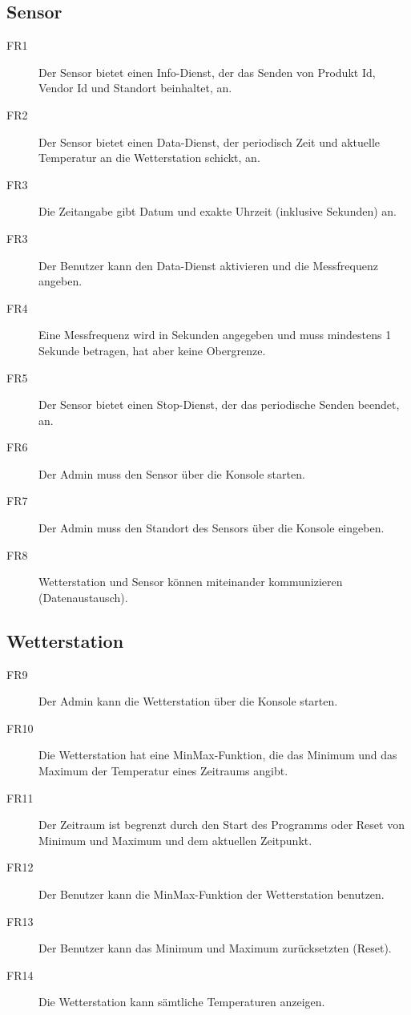 \documentclass[a4paper]{report}
\begin{document}
\subsection{Sensor}
\begin{description}
    \item[FR1] Der Sensor bietet einen Info-Dienst, der das Senden von Produkt Id, Vendor Id und Standort beinhaltet, an.
    \item[FR2] Der Sensor bietet einen Data-Dienst, der periodisch Zeit und aktuelle Temperatur an die Wetterstation schickt, an.
    \item[FR3] Die Zeitangabe gibt Datum und exakte Uhrzeit (inklusive Sekunden) an.
    \item[FR3] Der Benutzer kann den Data-Dienst aktivieren und die Messfrequenz angeben.
    \item[FR4] Eine Messfrequenz wird in Sekunden angegeben und muss mindestens 1 Sekunde betragen, hat aber keine Obergrenze.  
    \item[FR5] Der Sensor bietet einen Stop-Dienst, der das periodische Senden beendet, an.
    \item[FR6] Der Admin muss den Sensor über die Konsole starten.
    \item[FR7] Der Admin muss den Standort des Sensors über die Konsole eingeben.  
    \item[FR8] Wetterstation und Sensor können miteinander kommunizieren (Datenaustausch).  
\end{description}

\subsection{Wetterstation}
\begin{description}
    \item[FR9] Der Admin kann die Wetterstation über die Konsole starten.
    \item[FR10] Die Wetterstation hat eine MinMax-Funktion, die das Minimum und das Maximum der Temperatur eines Zeitraums angibt.
    \item[FR11] Der Zeitraum ist begrenzt durch den Start des Programms oder Reset von Minimum und Maximum und dem aktuellen Zeitpunkt.
    \item[FR12] Der Benutzer kann die MinMax-Funktion der Wetterstation benutzen.
    \item[FR13] Der Benutzer kann das Minimum und Maximum zurücksetzten (Reset).
    \item[FR14] Die Wetterstation kann sämtliche Temperaturen anzeigen. 
\end{description}
\end{document}
